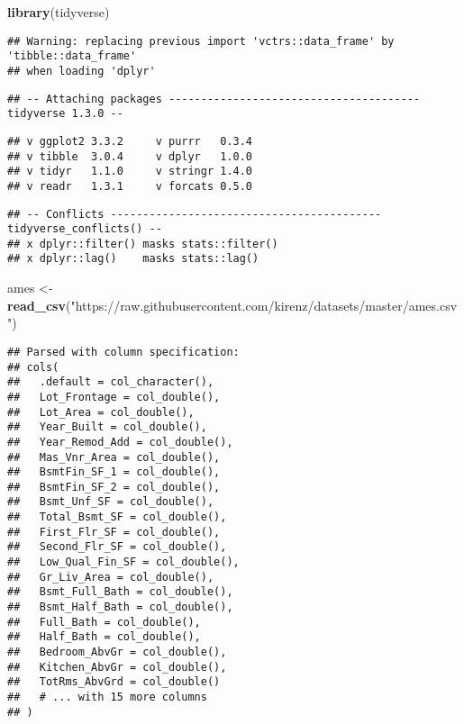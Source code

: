\documentclass[
]{book}
\newenvironment{Shaded}{\begin{snugshade}}{\end{snugshade}}
\newcommand{\KeywordTok}[1]{\textcolor[rgb]{0.13,0.29,0.53}{\textbf{#1}}}
\newcommand{\NormalTok}[1]{#1}
\newcommand{\StringTok}[1]{\textcolor[rgb]{0.31,0.60,0.02}{#1}}
\begin{document}
\begin{Shaded}
\begin{Highlighting}[]
\KeywordTok{library}\NormalTok{(tidyverse)}
\end{Highlighting}
\end{Shaded}

\begin{verbatim}
## Warning: replacing previous import 'vctrs::data_frame' by 'tibble::data_frame'
## when loading 'dplyr'
\end{verbatim}

\begin{verbatim}
## -- Attaching packages --------------------------------------- tidyverse 1.3.0 --
\end{verbatim}

\begin{verbatim}
## v ggplot2 3.3.2     v purrr   0.3.4
## v tibble  3.0.4     v dplyr   1.0.0
## v tidyr   1.1.0     v stringr 1.4.0
## v readr   1.3.1     v forcats 0.5.0
\end{verbatim}

\begin{verbatim}
## -- Conflicts ------------------------------------------ tidyverse_conflicts() --
## x dplyr::filter() masks stats::filter()
## x dplyr::lag()    masks stats::lag()
\end{verbatim}

\begin{Shaded}
\begin{Highlighting}[]
\NormalTok{ames \textless{}{-}}\StringTok{ }\KeywordTok{read\_csv}\NormalTok{(}\StringTok{"https://raw.githubusercontent.com/kirenz/datasets/master/ames.csv"}\NormalTok{)}
\end{Highlighting}
\end{Shaded}

\begin{verbatim}
## Parsed with column specification:
## cols(
##   .default = col_character(),
##   Lot_Frontage = col_double(),
##   Lot_Area = col_double(),
##   Year_Built = col_double(),
##   Year_Remod_Add = col_double(),
##   Mas_Vnr_Area = col_double(),
##   BsmtFin_SF_1 = col_double(),
##   BsmtFin_SF_2 = col_double(),
##   Bsmt_Unf_SF = col_double(),
##   Total_Bsmt_SF = col_double(),
##   First_Flr_SF = col_double(),
##   Second_Flr_SF = col_double(),
##   Low_Qual_Fin_SF = col_double(),
##   Gr_Liv_Area = col_double(),
##   Bsmt_Full_Bath = col_double(),
##   Bsmt_Half_Bath = col_double(),
##   Full_Bath = col_double(),
##   Half_Bath = col_double(),
##   Bedroom_AbvGr = col_double(),
##   Kitchen_AbvGr = col_double(),
##   TotRms_AbvGrd = col_double()
##   # ... with 15 more columns
## )
\end{verbatim}
\end{document}
